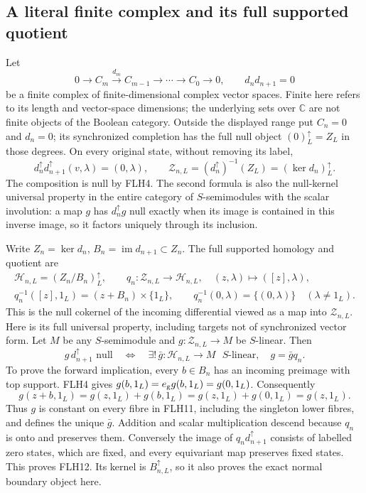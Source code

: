 \subsection{A literal finite complex and its full supported quotient}

Let
\[
0\longrightarrow C_m\xrightarrow{d_m}C_{m-1}
\longrightarrow\cdots\longrightarrow C_0\longrightarrow0,
\qquad d_nd_{n+1}=0
\tag{FLH9}
\]
be a finite complex of finite-dimensional complex vector spaces.
Finite here refers to its length and vector-space dimensions;
the underlying sets over \(\mathbb C\) are not finite objects
of the Boolean category.
Outside the displayed range put \(C_n=0\) and \(d_n=0\);
its synchronized completion has the full null object
\((0)_L^\uparrow=Z_L\) in those degrees. On every original
state, without removing its label,
\[
d_n^\uparrow d_{n+1}^\uparrow(v,\lambda)=(0,\lambda),
\qquad
\mathcal Z_{n,L}=(d_n^\uparrow)^{-1}(Z_L)
=(\ker d_n)_L^\uparrow .
\tag{FLH10}
\]
The composition is null by FLH4. The second formula is also
the null-kernel universal property in the entire category of
\(S\)-semimodules with the scalar involution: a map \(g\)
has \(d_n^\uparrow g\) null exactly when its image is contained
in this inverse image, so it factors uniquely through its
inclusion.

Write \(Z_n=\ker d_n\), \(B_n=\operatorname{im}d_{n+1}\subset Z_n\).
The full supported homology and quotient are
\[
\begin{gathered}
\mathcal H_{n,L}=(Z_n/B_n)_L^\uparrow,\qquad
q_n:\mathcal Z_{n,L}\longrightarrow\mathcal H_{n,L},\quad
(z,\lambda)\longmapsto([z],\lambda),\\
q_n^{-1}([z],1_L)=(z+B_n)\times\{1_L\},\qquad
q_n^{-1}(0,\lambda)=\{(0,\lambda)\}\quad(\lambda\ne1_L).
\end{gathered}\tag{FLH11}
\]
This is the null cokernel of the incoming differential viewed
as a map into \(\mathcal Z_{n,L}\). Here is its full universal
property, including targets not of synchronized vector form.
Let \(M\) be any \(S\)-semimodule and
\(g:\mathcal Z_{n,L}\to M\) be \(S\)-linear.
Then
\[
g\,d_{n+1}^\uparrow\text{ null}
\quad\Longleftrightarrow\quad
\exists!\,\bar g:\mathcal H_{n,L}\to M\text{ \(S\)-linear},
\quad g=\bar g q_n .
\tag{FLH12}
\]
To prove the forward implication, every \(b\in B_n\) has an
incoming preimage with top support. FLH4 gives
\(g(b,1_L)=e_{\rm g}g(b,1_L)=g(0,1_L)\).
Consequently
\[
g(z+b,1_L)=g(z,1_L)+g(b,1_L)
          =g(z,1_L)+g(0,1_L)=g(z,1_L).
\]
Thus \(g\) is constant on every fibre in FLH11, including
the singleton lower fibres, and defines the unique \(\bar g\).
Addition and scalar multiplication descend because \(q_n\)
is onto and preserves them. Conversely the image of
\(q_nd_{n+1}^\uparrow\) consists of labelled zero states,
which are fixed, and every equivariant map preserves fixed
states. This proves FLH12. Its kernel is \(B_{n,L}^\uparrow\),
so it also proves the exact normal boundary object here.

